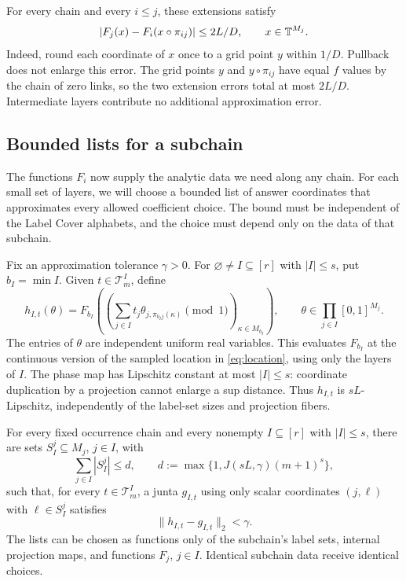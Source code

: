 For every chain and every $i\le j$, these extensions satisfy
\begin{equation}\label{eq:compatibility}
 |F_j(x)-F_i(x\circ\pi_{ij})|
 \le 2L/D,\qquad x\in\mathbb T^{M_j}.
\end{equation}
Indeed, round each coordinate of $x$ once to a grid point $y$
within $1/D$. Pullback does not enlarge this error.
The grid points $y$ and $y\circ\pi_{ij}$ have equal $f$ values by
the chain of zero links, so the two extension errors total at most
$2L/D$. Intermediate layers contribute no additional approximation
error.

\subsection{Bounded lists for a subchain}

The functions $F_i$ now supply the analytic data we need along any chain.
For each small set of layers, we will choose a bounded list of answer
coordinates that approximates every allowed coefficient choice.
The bound must be independent of the Label Cover alphabets, and the
choice must depend only on the data of that subchain.

Fix an approximation tolerance $\gamma>0$.
For $\varnothing\ne I\subseteq[r]$ with $|I|\le s$, put $b_I=\min I$.
Given $t\in\mathcal T_m^I$, define
\begin{equation}\label{eq:subchain-functions}
 h_{I,t}(\theta)
 =F_{b_I}\left(
  \left(\sum_{j\in I}t_j\theta_{j,\pi_{b_Ij}(\kappa)}
            \pmod1\right)_{\kappa\in M_{b_I}}\right),
 \qquad
 \theta\in\prod_{j\in I}[0,1]^{M_j}.
\end{equation}
The entries of $\theta$ are independent uniform real variables.
This evaluates $F_{b_I}$ at the continuous version of the sampled
location in \eqref{eq:location}, using only the layers of $I$.
The phase map has Lipschitz constant at most $|I|\le s$:
coordinate duplication by a projection cannot enlarge a sup distance.
Thus $h_{I,t}$ is $sL$-Lipschitz, independently of the label-set sizes
and projection fibers.

\begin{lemma}\label{lem:subchain-lists}
For every fixed occurrence chain and every nonempty $I\subseteq[r]$
with $|I|\le s$, there are sets
$S_I^j\subseteq M_j$, $j\in I$, with
\begin{equation}\label{eq:list-size}
 \sum_{j\in I}|S_I^j|\le d,
 \qquad d:=\max\{1,J(sL,\gamma)(m+1)^s\},
\end{equation}
such that, for every $t\in\mathcal T_m^I$, a junta $g_{I,t}$ using
only scalar coordinates $(j,\ell)$ with $\ell\in S_I^j$ satisfies
\begin{equation}\label{eq:subchain-junta}
 \|h_{I,t}-g_{I,t}\|_2<\gamma.
\end{equation}
The lists can be chosen as functions only of the subchain's label sets,
internal projection maps, and functions $F_j$, $j\in I$.
Identical subchain data receive identical choices.
\end{lemma}


